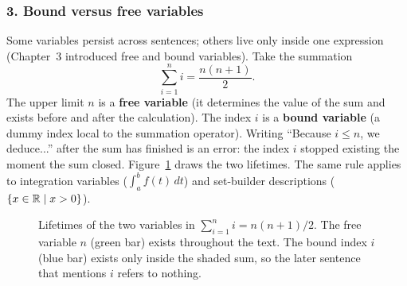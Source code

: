 \subsubsection{3. Bound versus free variables}
Some variables persist across sentences; others live only inside one expression (Chapter~3 introduced free and bound variables). Take the summation
\[
\sum_{i=1}^{n} i = \frac{n(n+1)}{2}.
\]
The upper limit $n$ is a \textbf{free variable} (it determines the value of the sum and exists before and after the calculation). The index $i$ is a \textbf{bound variable} (a dummy index local to the summation operator). Writing ``Because $i \le n$, we deduce...'' after the sum has finished is an error: the index $i$ stopped existing the moment the sum closed. Figure~\ref{30:fig-bound-free} draws the two lifetimes. The same rule applies to integration variables ($\int_a^b f(t)\,dt$) and set-builder descriptions ($\{x \in \mathbb{R} \mid x > 0\}$).

\begin{figure}[htbp]
\centering
{}
\caption{Lifetimes of the two variables in $\sum_{i=1}^{n} i = n(n+1)/2$. The free variable $n$ (green bar) exists throughout the text. The bound index $i$ (blue bar) exists only inside the shaded sum, so the later sentence that mentions $i$ refers to nothing.}
\label{30:fig-bound-free}
\end{figure}

